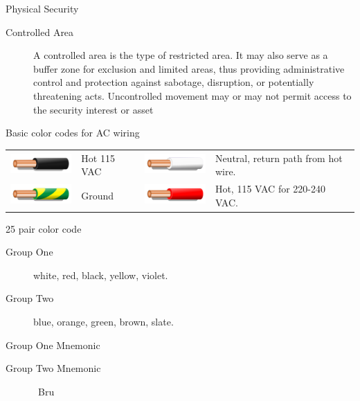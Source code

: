 \documentclass[landscape,fontscale=1,margin=0.2cm,paperwidth=70truecm, paperheight=40truecm,debug]{baposter}
\begin{document}
\begin{poster}
\begin{posterbox}[column=3,below=auto]{Physical Security}
\begin{description}
\item[Controlled Area] A controlled area is the \textbf{\color{orange}{least secure}} type of restricted area. It may also serve as a buffer zone for exclusion and limited areas, thus providing administrative control and protection against sabotage, disruption, or potentially threatening acts. Uncontrolled movement may or may not permit access to the security interest or asset
\end{description}
\end{posterbox}
\begin{posterbox}[column=3,below=auto,height=bottom]{Basic color codes for AC wiring}
\begin{tabular}{llll}
\includegraphics[scale=0.8]{Color_wire_black.png}& Hot 115 VAC & \includegraphics[scale=0.8]{Color_wire_white.png}&Neutral, return path from hot wire.\\
\includegraphics[scale=0.8]{Color_wire_green_yellow.png}& Ground & \includegraphics[scale=0.8]{Color_wire_red.png}& Hot, 115 VAC for 220-240 VAC.
\end{tabular}
\end{posterbox}
\begin{posterbox}[column=4]{25 pair color code}
\begin{description}
\item[Group One] white, red, black, yellow, violet.
\item[Group Two] blue, orange, green, brown, slate.
\end{description}
\begin{description}
\item[Group One Mnemonic] \colorbox{black}{\color{white}{Winchester}} \color{red}{Rifles} \color{black}{Bring} \colorbox{black}{\color{yellow}{You}} \color{purple}{Victory}
\item[Group Two Mnemonic] \color{blue}{B}\color{orange}{O}\color{green}{G}\color{brown}~{Br}u\color{gray}{Sh}

\end{description}
\end{posterbox}
\end{poster}
\end{document}
